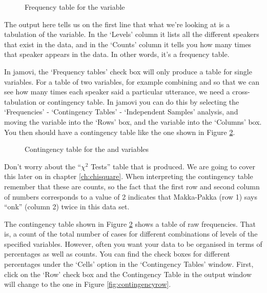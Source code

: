 \vspace{0.5cm}
\begin{figure}[htb]
\begin{center}
\caption{Frequency table for the  variable}
\label{fig:freqtable}
\HR
\end{center}
\end{figure}

The output here tells us on the first line that what we're looking at is a tabulation of the  variable. In the `Levels' column it lists all the different speakers that exist in the data, and in the `Counts' column it tells you how many times that speaker appears in the data. In other words, it's a frequency table. 

In jamovi, the `Frequency tables' check box will only produce a table for single variables. For a table of two variables, for example combining  and  so that we can see how many times each speaker said a particular utterance, we need a cross-tabulation or contingency table. In jamovi you can do this by selecting the `Frequencies' - `Contingency Tables' - `Independent Samples' analysis, and moving the  variable into the `Rows' box, and the  variable into the `Columns' box. You then should have a contingency table like the one shown in Figure \ref{fig:contingencytable}. 

\vspace{0.5cm}
\begin{figure}[htb]
\begin{center}
\caption{Contingency table for the  and  variables}
\label{fig:contingencytable}
\HR
\end{center}
\end{figure}

Don't worry about the ``$\chi^2$ Tests'' table that is produced. We are going to cover this later on in chapter \ref{ch:chisquare}. When interpreting the contingency table remember that these are counts, so the fact that the first row and second column of numbers corresponds to a value of 2 indicates that Makka-Pakka (row 1) says ``onk'' (column 2) twice in this data set. 


The contingency table shown in Figure \ref{fig:contingencytable} shows a table of raw frequencies. That is, a count of the total number of cases for different combinations of levels of the specified variables. However, often you want your data to be organised in terms of percentages as well as counts. You can find the check boxes for different percentages under the `Cells' option in the `Contingency Tables' window. First, click on the `Row' check box and the Contingency Table in the output window will change to the one in Figure \ref{fig:contingencyrow}. 


